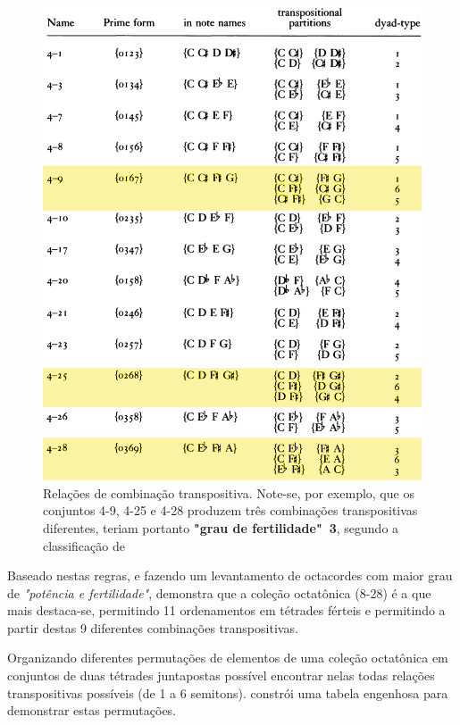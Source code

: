 \documentclass[
	12pt,				%
	openright,			%
	twoside,			%
	a4paper,			%
	english,			%
	french,				%
	spanish,			%
	brazil				%
	]{abntex2}
\begin{document}
\begin{figure}[!h]
	\caption{\label{fig_grafico} Relações de combinação transpositiva. Note-se, por exemplo, que os conjuntos 4-9, 4-25 e 4-28 produzem três combinações transpositivas diferentes, teriam portanto \textbf{"grau de fertilidade"\ 3}, segundo a classificação de   }
	\begin{center}
	    \includegraphics[scale=0.35]{octa/trasposiCohn.png}
	\end{center}
\end{figure}


Baseado nestas regras, e fazendo um levantamento de octacordes com maior grau de \textit{"potência e fertilidade"},  demonstra que a coleção octatônica (8-28) é a que mais destaca-se, permitindo 11 ordenamentos em tétrades férteis e permitindo a partir destas 9 diferentes combinações transpositivas.


Organizando diferentes permutações de elementos de uma coleção octatônica em conjuntos de duas tétrades juntapostas possível encontrar nelas todas relações transpositivas possíveis (de 1 a 6 semitons).  constrói uma tabela engenhosa para demonstrar estas permutações. 
\end{document}
